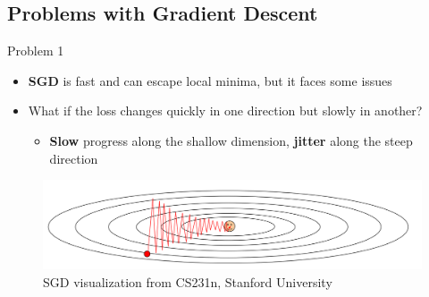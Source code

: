 \documentclass[serif, aspectratio=169]{beamer}
\begin{document}
\subsection{Problems with Gradient Descent}
\begin{frame}{Problem 1}
    \begin{itemize}
        \item \textbf{SGD} is fast and can escape local minima, but it faces some issues
        \item What if the loss changes quickly in one direction but slowly in another?
        \begin{itemize}
            \item \textbf{Slow} progress along the shallow dimension, \textbf{jitter} along the steep direction
        \end{itemize}
    \end{itemize}
    \hfill
    \hfill
    \begin{center}
        \begin{figure}
            \includegraphics[width=1\linewidth]{pic/sgd_stanford.png}
            \caption{\footnotesize SGD visualization from CS231n, Stanford University}
        \end{figure}
    \end{center}
\end{frame}
\end{document}
